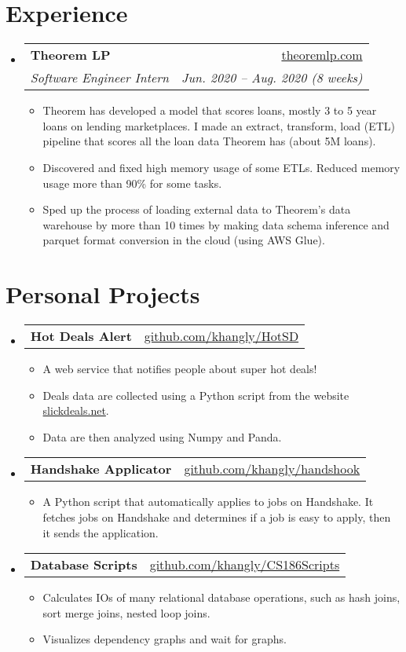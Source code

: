 \documentclass[letterpaper,11pt]{article}
\makeatletter
\newcommand{\resumeItem}[2]{
  \item\small{
    \textbf{#1}{: #2 \vspace{-2pt}}
  }
}
\newcommand{\resumeSubheading}[4]{
  \vspace{-1pt}\item
    \begin{tabular*}{0.97\textwidth}[t]{l@{\extracolsep{\fill}}r}
      \textbf{#1} & #2 \\
      \textit{\small#3} & \textit{\small #4} \\
    \end{tabular*}\vspace{-5pt}
}
\newcommand{\resumeSubHeadingListStart}{\begin{itemize}[leftmargin=*]}
\newcommand{\resumeSubHeadingListEnd}{\end{itemize}}
\newcommand{\resumeItemListStart}{\begin{itemize}}
\newcommand{\resumeItemListEnd}{\end{itemize}\vspace{-5pt}}
\newcommand{\resumeSubheadingD}[2]{
  \vspace{-1pt}\item
    \begin{tabular*}{0.97\textwidth}[t]{l@{\extracolsep{\fill}}r}
      \textbf{#1} & #2 \\
    \end{tabular*}\vspace{-5pt}
}
\newcommand{\resumeItemD}[1]{
  \item\small{
    #1 \vspace{-2pt}
  }
}
\makeatother
\begin{document}
\section{Experience}
  \resumeSubHeadingListStart
      \resumeSubheading
        {Theorem LP}{\href{https://www.theoremlp.com/}{theoremlp.com}}
        {Software Engineer Intern}{Jun. 2020 – Aug. 2020 (8 weeks)}
        \resumeItemListStart
          \resumeItemD{Theorem has developed a model that scores loans, mostly 3 to 5 year loans on lending marketplaces. I made an extract, transform, load (ETL) pipeline that scores all the loan data Theorem has (about 5M loans).}
          \resumeItemD{Discovered and fixed high memory usage of some ETLs. Reduced memory usage more than 90\% for some tasks.}
          \resumeItemD{Sped up the process of loading external data to Theorem's data warehouse by more than 10 times by making data schema inference and parquet format conversion in the cloud (using AWS Glue).}
        \resumeItemListEnd
  \resumeSubHeadingListEnd


\section{Personal Projects}
  \resumeSubHeadingListStart
    \resumeSubheadingD
    	{Hot Deals Alert}{\href{https://github.com/khangly/HotSD}{github.com/khangly/HotSD}}
      \resumeItemListStart
        \resumeItemD
          {A web service that notifies people about super hot deals!}
        \resumeItemD
          {Deals data are collected using a Python script from the website \href{https://slickdeals.net}{slickdeals.net}.}
        \resumeItemD
          {Data are then analyzed using Numpy and Panda.}
      \resumeItemListEnd
    \resumeSubheadingD
    	{Handshake Applicator}{\href{https://github.com/khangly/handshook}{github.com/khangly/handshook}}
      \resumeItemListStart
        \resumeItemD{A Python script that automatically applies to jobs on Handshake. It fetches jobs on Handshake and determines if a job is easy to apply, then it sends the application.}
      \resumeItemListEnd
    \resumeSubheadingD
    	{Database Scripts}{\href{https://github.com/khangly/CS186Scripts}{github.com/khangly/CS186Scripts}}
      \resumeItemListStart
        \resumeItemD{Calculates IOs of many relational database operations, such as hash joins, sort merge joins, nested loop joins.}
        \resumeItemD{Visualizes dependency graphs and wait for graphs.}
      \resumeItemListEnd
  \resumeSubHeadingListEnd
\end{document}
